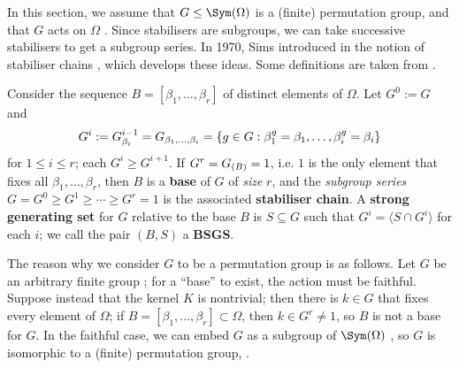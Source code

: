 In this section, we assume that $G \leq \Sym(\Omega)$ is a (finite) permutation group, and that $G$ acts on $\Omega$ .  Since stabilisers are subgroups, we can take successive stabilisers to get a subgroup series. In 1970, Sims introduced in \cite{sims1970} the notion of stabiliser chains , which develops these ideas. Some definitions are taken from \cite{blaha1992}.

\begin{definition}\label{def:base_stabiliser_chain}
    Consider the sequence $B = [\beta_1,\dotsc,\beta_r]$ of distinct elements of $\Omega$. Let $G^0 := G$ and
    $$G^i := \added{2}{G^{i-1}_{\beta_i}} = \added{2}{G_{\beta_1,\dotsc,\beta_i}} = \{g \in G : \beta_1^g = \beta_1,\dotsc,\beta_i^g = \beta_i\}$$
    for $1 \leq i \leq r$; each $G^i \geq G^{i+1}$. If $G^r = \added{2}{G_{(B)}} = 1$, i.e. $1$ is the only element that fixes all $\beta_1,\dotsc,\beta_r$, then $B$ is a \textbf{base} of $G$ of \textit{size} $r$, and the \textit{subgroup series} $G = G^0 \geq G^1 \geq \dotsb \geq G^r = 1$ is the associated \textbf{stabiliser chain}. A \textbf{strong generating set} for $G$ relative to the base $B$ is $S \subseteq G$ such that $G^i = \langle S \cap G^i \rangle$ for each $i$; we call the pair $(B,S)$ a \textbf{BSGS}.
\end{definition}

 The reason why we consider $G$ to be a permutation group is as follows. Let $G$ be an arbitrary finite group ; for a ``base'' to exist, the action must be faithful. Suppose instead that the kernel $K$  is nontrivial; then there is $k \in G$ that fixes every element of $\Omega$; if $B = [\beta_1,\dotsc,\beta_r] \subset \Omega$, then $k \in G^r \neq 1$, so $B$ is not a base for $G$. In the faithful case, we can embed $G$ as a subgroup of $\Sym(\Omega)$ , so $G$ is isomorphic to a (finite) permutation group, .

